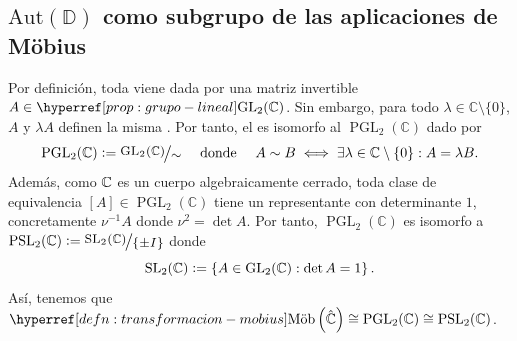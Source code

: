 \subsection{$\mathrm{Aut} \left(\mathbb{D} \right)$ como subgrupo de las aplicaciones de Möbius}

Por definición, toda  viene dada por una matriz invertible $A \in \exhyperref[prop:grupo-lineal]{grupo-lineal}{\operatorname{GL}_2}(\mathbb{C})$. Sin embargo, para todo $\lambda \in \mathbb{C} \setminus \{0\}$, $A$ y $\lambda A$ definen la misma . Por tanto, el  es isomorfo al  $\operatorname{PGL}_2(\mathbb{C})$ dado por
\[
\operatorname{PGL}_2(\mathbb{C}) \defeq \sfrac{\operatorname{GL}_2(\mathbb{C})}{\sim} \quad \text{ donde }\quad A \sim B \iff \exists \lambda \in \mathbb{C} \setminus \{0\} : A = \lambda B. 
\]
Además, como $\mathbb{C}$ es un cuerpo algebraicamente cerrado, toda clase de equivalencia $[A] \in \operatorname{PGL}_2(\mathbb{C})$ tiene un representante con determinante $1$, concretamente $\nu^{-1} A$ donde $\nu^2 = \det A$. Por tanto, $\operatorname{PGL}_2(\mathbb{C})$ es isomorfo a $\operatorname{PSL}_2(\mathbb{C}) \defeq \sfrac{\operatorname{SL}_2(\mathbb{C})}{\{\pm I\}}$ donde
\[
\operatorname{SL}_2(\mathbb{C}) \vcentcolon= \left\{ A \in \operatorname{GL}_2(\mathbb{C}) : \det A = 1 \right\}.
\]
Así, tenemos que $\exhyperref[defn:transformacion-mobius]{transformacion-mobius}{\operatorname{M\ddot{o}b}} \left(\hat{\mathbb{C}}\right) \cong \operatorname{PGL}_2(\mathbb{C}) \cong \operatorname{PSL}_2(\mathbb{C})$.


